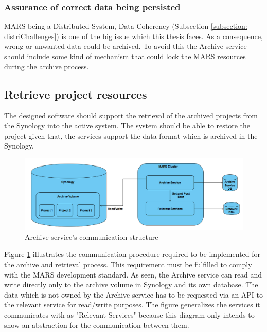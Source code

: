         \subsubsection{Assurance of correct data being persisted}
            MARS being a Distributed System, Data Coherency (Subsection \ref{subsection: distriChallenges}) 
            is one of the big issue which this thesis faces. As a consequence,
            wrong or unwanted data could be archived. To avoid this the Archive service should include some kind of mechanism that
            could lock the MARS resources during the archive process.
        
        \subsection{Retrieve project resources}    
            The designed software should support the retrieval of the archived projects from the Synology into the active system. The
            system should be able to restore the project given that, the services support the data format which is archived in the Synology.
           
            \begin{figure}[H]
                \centering \includegraphics[scale=0.4]{grafiken/synology.png}
                \caption{Archive service's communication structure}
                \label{fig:synology}
            \end{figure}

            Figure \ref{fig:synology} illustrates the communication procedure required to be implemented for the archive and retrieval process. 
            This requirement must be fulfilled to comply with the MARS development standard. As seen, the
            Archive service can read and write directly only to the archive volume in Synology and its own database. The data which is not owned by the Archive
            service has to be requested via an API to the relevant service for read/write purposes. The figure generalizes the services it communicates with
            as "Relevant Services" because this diagram only intends to show an abstraction for the communication between them.


